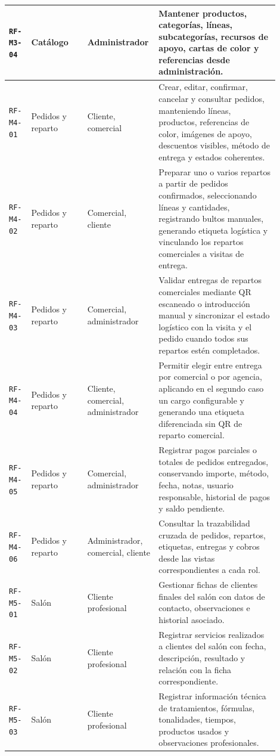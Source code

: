 {\begin{supertabular}{|>{\raggedright\arraybackslash}p{0.085\linewidth}|>{\raggedright\arraybackslash}p{0.205\linewidth}|>{\raggedright\arraybackslash}p{0.18\linewidth}|>{\raggedright\arraybackslash}p{0.43\linewidth}|}
\hline
\texttt{RF-M3-04} & Catálogo & Administrador & Mantener productos, categorías, líneas, subcategorías, recursos de apoyo, cartas de color y referencias desde administración. \\
\hline
{}
\texttt{RF-M4-01} & Pedidos y reparto & Cliente, comercial & Crear, editar, confirmar, cancelar y consultar pedidos, manteniendo líneas, productos, referencias de color, imágenes de apoyo, descuentos visibles, método de entrega y estados coherentes. \\
\hline
\texttt{RF-M4-02} & Pedidos y reparto & Comercial, cliente & Preparar uno o varios repartos a partir de pedidos confirmados, seleccionando líneas y cantidades, registrando bultos manuales, generando etiqueta logística y vinculando los repartos comerciales a visitas de entrega. \\
\hline
\texttt{RF-M4-03} & Pedidos y reparto & Comercial, administrador & Validar entregas de repartos comerciales mediante QR escaneado o introducción manual y sincronizar el estado logístico con la visita y el pedido cuando todos sus repartos estén completados. \\
\hline
\texttt{RF-M4-04} & Pedidos y reparto & Cliente, comercial, administrador & Permitir elegir entre entrega por comercial o por agencia, aplicando en el segundo caso un cargo configurable y generando una etiqueta diferenciada sin QR de reparto comercial. \\
\hline
\texttt{RF-M4-05} & Pedidos y reparto & Comercial, administrador & Registrar pagos parciales o totales de pedidos entregados, conservando importe, método, fecha, notas, usuario responsable, historial de pagos y saldo pendiente. \\
\hline
\texttt{RF-M4-06} & Pedidos y reparto & Administrador, comercial, cliente & Consultar la trazabilidad cruzada de pedidos, repartos, etiquetas, entregas y cobros desde las vistas correspondientes a cada rol. \\
\hline
{}
\texttt{RF-M5-01} & Salón & Cliente profesional & Gestionar fichas de clientes finales del salón con datos de contacto, observaciones e historial asociado. \\
\hline
\texttt{RF-M5-02} & Salón & Cliente profesional & Registrar servicios realizados a clientes del salón con fecha, descripción, resultado y relación con la ficha correspondiente. \\
\hline
\texttt{RF-M5-03} & Salón & Cliente profesional & Registrar información técnica de tratamientos, fórmulas, tonalidades, tiempos, productos usados y observaciones profesionales. \\

\end{supertabular}}
